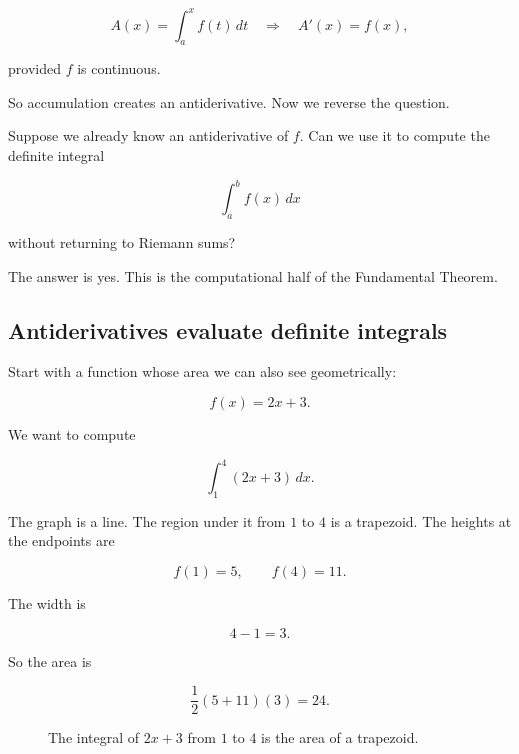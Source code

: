 \[
A(x)=\int_a^x f(t)\,dt
\quad\Longrightarrow\quad
A'(x)=f(x),
\]

provided \(f\) is continuous.

So accumulation creates an antiderivative.  Now we reverse the question.

Suppose we already know an antiderivative of \(f\).  Can we use it to compute the
definite integral

\[
\int_a^b f(x)\,dx
\]

without returning to Riemann sums?

The answer is yes.  This is the computational half of the Fundamental Theorem.

\subsection{Antiderivatives evaluate definite integrals}
\label{subsec:antiderivatives-evaluate-definite-integrals}

Start with a function whose area we can also see geometrically:

\[
f(x)=2x+3.
\]

We want to compute

\[
\int_1^4 (2x+3)\,dx.
\]

The graph is a line.  The region under it from \(1\) to \(4\) is a trapezoid.  The heights
at the endpoints are

\[
f(1)=5,
\qquad
f(4)=11.
\]

The width is

\[
4-1=3.
\]

So the area is

\[
\frac12(5+11)(3)=24.
\]

\begin{figure}[h]
\centering
{}
\caption{The integral of \(2x+3\) from \(1\) to \(4\) is the area of a trapezoid.}
\label{fig:ftc2-line-area}
\end{figure}

